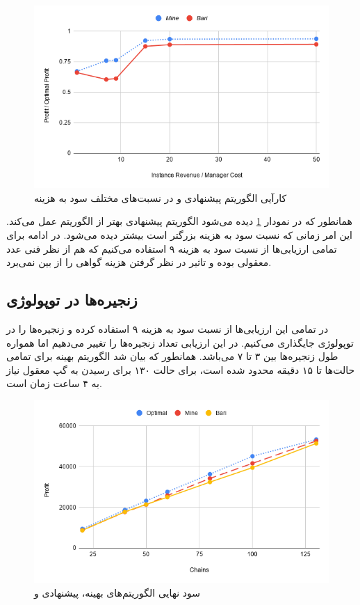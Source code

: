 \begin{figure}[h]
\center\includegraphics[scale=.5]{images/chart-1}
\caption{کارآیی الگوریتم پیشنهادی و \cite{Bari2015} در نسبت‌های مختلف سود به هزینه}
\label{fig.4}
\end{figure}

همانطور که در نمودار \ref{fig.4} دیده می‌شود الگوریتم پیشنهادی بهتر از الگوریتم \cite{Bari2015} عمل می‌کند.
این امر زمانی که نسبت سود به هزینه بزرگتر است بیشتر دیده می‌شود.
در ادامه برای تمامی ارزیابی‌ها از نسبت سود به هزینه ۹ استفاده می‌کنیم که هم از نظر فنی عدد معقولی بوده و تاثیر در نظر گرفتن هزینه گواهی را از بین نمی‌برد.

\subsection{زنجیره‌ها در توپولوژی }

در تمامی این ارزیابی‌ها از نسبت سود به هزینه ۹ استفاده کرده و زنجیره‌ها را در توپولوژی  جایگذاری می‌کنیم.
در این ارزیابی تعداد زنجیره‌ها را تغییر می‌دهیم اما همواره طول زنجیره‌ها بین ۳ تا ۷ می‌باشد.
همانطور که بیان شد الگوریتم بهینه برای تمامی حالت‌ها تا ۱۵ دقیقه محدود شده است، برای حالت ۱۳۰ برای رسیدن به گپ معقول نیاز به ۴ ساعت زمان است.


\begin{figure}[h]
\center\includegraphics[scale=.5]{images/chart-2}
\caption{سود نهایی الگوریتم‌های بهینه، پیشنهادی و \cite{Bari2015}}
\label{fig.7}
\end{figure}


